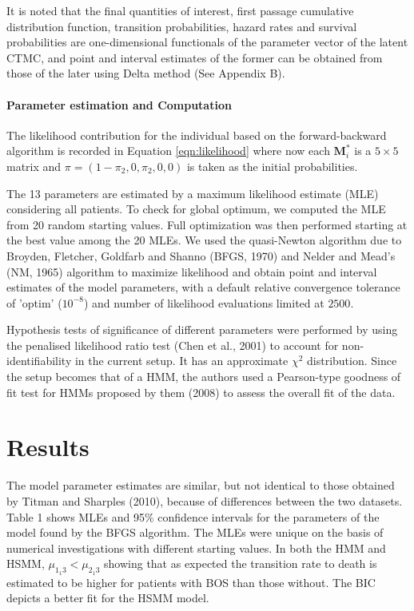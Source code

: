 \documentclass{uwstat572}
\begin{document}
It is noted that the final quantities of interest, first passage cumulative distribution function, transition probabilities, hazard rates and survival probabilities are one-dimensional functionals of the parameter vector of the latent CTMC, and point and interval estimates of the former can be obtained from those of the later using Delta method (See Appendix B).

\paragraph{Parameter estimation and Computation}
The likelihood contribution for the individual based on the forward-backward algorithm is recorded in Equation \ref{eqn:likelihood} where now each $\bm{M}_i^*$ is a $5\times 5$ matrix and $\pi=(1-\pi_{2},0,\pi_{2},0,0)$ is taken as the initial probabilities.

The 13 parameters are estimated by a maximum likelihood estimate (MLE) considering all patients. To check for global optimum, we computed the MLE from 20 random starting values. Full optimization was then performed starting at the best value among the 20 MLEs. We used the quasi-Newton algorithm due to Broyden, Fletcher, Goldfarb and Shanno (BFGS, 1970) and Nelder and Mead's (NM, 1965) algorithm to maximize likelihood and obtain point and interval estimates of the model parameters, with a default relative convergence tolerance of 'optim' ($10^{-8}$) and number of likelihood evaluations limited at $2500$.

Hypothesis tests of significance of different parameters were performed  by using the penalised likelihood ratio test (Chen et al., 2001) to account for non-identifiability in the current setup. It has an approximate $\chi^2$ distribution. Since the setup becomes that of a HMM, the authors used a Pearson-type goodness of fit test for HMMs proposed by them (2008) to assess the overall fit of the data.

\section{Results}
The model parameter estimates are similar, but not identical to those obtained by Titman and Sharples (2010), because of differences between the two datasets. Table 1 shows MLEs and 95\% confidence intervals for the parameters of the model found by the BFGS algorithm. The MLEs were unique on the basis of numerical investigations with different starting values. In both the HMM and HSMM, $\mu_{1_1 3}<\mu_{2_1 3}$ showing that as expected the transition rate to death is estimated to be higher for patients with BOS than those without. The BIC depicts a better fit for the HSMM model.
\end{document}
